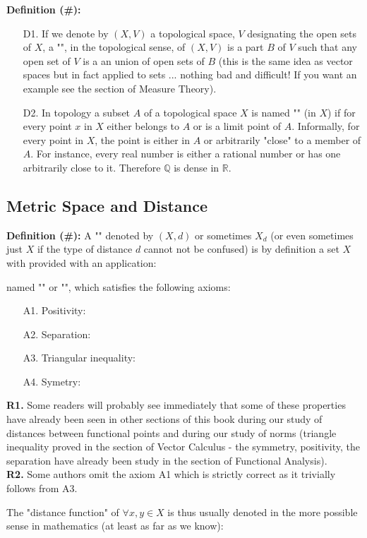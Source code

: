 	\textbf{Definition (\#\mydef):} 
	\begin{enumerate}
		\item[D1.] If we denote by $(X, V)$ a topological space, $V$ designating the open sets of $X$, a "", in the topological sense, of $(X, V)$ is a part $B$ of $V$ such that any open set of $V$ is a an union of open sets of $B$ (this is the same idea as vector spaces but in fact applied to sets ... nothing bad and difficult! If you want an example see the section of Measure Theory).
		
		\item[D2.] In topology a subset $A$ of a topological space $X$ is named "\label{dense set}" (in $X$) if for every point $x$ in $X$ either belongs to $A$ or is a limit point of $A$. Informally, for every point in $X$, the point is either in $A$ or arbitrarily "close" to a member of $A$. For instance, every real number is either a rational number or has one arbitrarily close to it. Therefore $\mathbb{Q}$ is dense in $\mathbb{R}$.
	\end{enumerate}
	
	\pagebreak
	\subsection{Metric Space and Distance}\label{distance}
	\textbf{Definition (\#\mydef):} A "" denoted by $(X, d)$ or sometimes $X_d$ (or even sometimes just $X$ if the type of distance $d$ cannot not be confused) is by definition a set $X$ with provided with an application:
	
	named "" or "", which satisfies the following axioms:
	\begin{itemize}
		\item[A1.] Positivity:
		
		
		\item[A2.] Separation:
		
		\item[A3.] Triangular inequality:
		
		
		\item[A4.] Symetry: 
		
	\end{itemize}
	\begin{tcolorbox}[title=Remarks,colframe=black,arc=10pt]
		\textbf{R1.} Some readers will probably see immediately that some of these properties have already been seen in other sections of this book during our study of distances between functional points and during our study of norms (triangle inequality proved in the section of Vector Calculus - the symmetry, positivity, the separation have already been study in the section of Functional Analysis).\\
		
		\textbf{R2.} Some authors omit the axiom A1 which is strictly correct as it trivially follows from A3.\\
	\end{tcolorbox}
	The "distance function" of $\forall x,y \in X$ is thus usually denoted in the more possible sense in mathematics (at least as far as we know):
	
